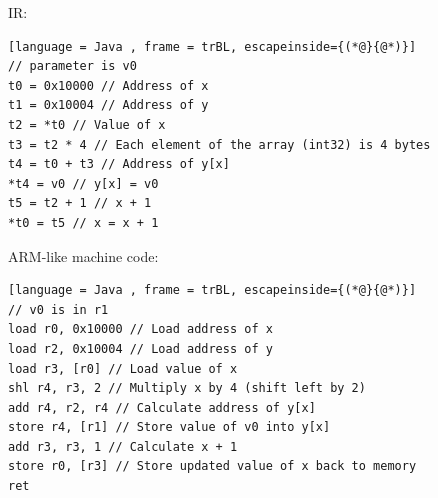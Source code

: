 IR:
\begin{lstlisting}[language = Java , frame = trBL, escapeinside={(*@}{@*)}]
// parameter is v0
t0 = 0x10000 // Address of x
t1 = 0x10004 // Address of y
t2 = *t0 // Value of x
t3 = t2 * 4 // Each element of the array (int32) is 4 bytes 
t4 = t0 + t3 // Address of y[x]
*t4 = v0 // y[x] = v0
t5 = t2 + 1 // x + 1
*t0 = t5 // x = x + 1
\end{lstlisting}

ARM-like machine code:
\begin{lstlisting}[language = Java , frame = trBL, escapeinside={(*@}{@*)}]
// v0 is in r1
load r0, 0x10000 // Load address of x 
load r2, 0x10004 // Load address of y
load r3, [r0] // Load value of x
shl r4, r3, 2 // Multiply x by 4 (shift left by 2)
add r4, r2, r4 // Calculate address of y[x]
store r4, [r1] // Store value of v0 into y[x]
add r3, r3, 1 // Calculate x + 1
store r0, [r3] // Store updated value of x back to memory
ret
\end{lstlisting}
